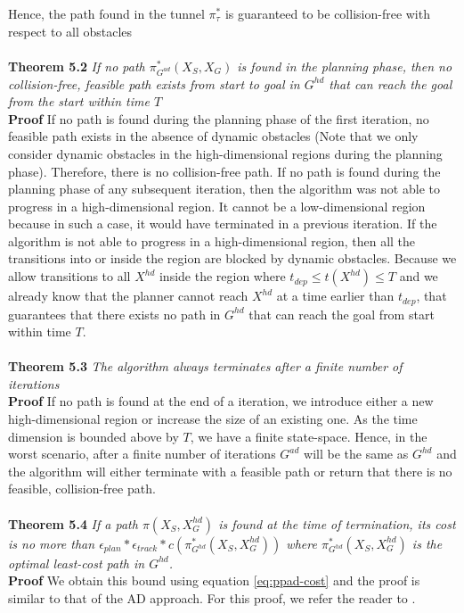 Hence, the path found in the tunnel $\pi_\tau^*$ is guaranteed to be collision-free with respect to all obstacles \QEDB \\ \\
\textbf{Theorem 5.2} \textit{If no path $\pi_{G^{ad}}^*(X_S,X_G)$ is found in the planning phase, then no collision-free, feasible path exists from start to goal in $G^{hd}$ that can reach the goal from the start within time $T$} \\
\textbf{Proof} If no path is found during the planning phase of the first iteration, no feasible path exists in the absence of dynamic obstacles (Note that we only consider dynamic obstacles in the high-dimensional regions during the planning phase). Therefore, there is no collision-free path. If no path is found during the planning phase of any subsequent iteration, then the algorithm was not able to progress in a high-dimensional region. It cannot be a low-dimensional region because in such a case, it would have terminated in a previous iteration. If the algorithm is not able to progress in a high-dimensional region, then all the transitions into or inside the region are blocked by dynamic obstacles. Because we allow transitions to all $X^{hd}$ inside the region where $t_{dep} \leq t(X^{hd}) \leq T$ and we already know that the planner cannot reach $X^{hd}$ at a time earlier than $t_{dep}$, that guarantees that there exists no path in $G^{hd}$ that can reach the goal from start within time $T$.\QEDB\\ \\
\textbf{Theorem 5.3} \textit{The algorithm always terminates after a finite number of iterations} \\
\textbf{Proof} If no path is found at the end of a iteration, we introduce either a new high-dimensional region or increase the size of an existing one. As the time dimension is bounded above by $T$, we have a finite state-space. Hence, in the worst scenario, after a finite number of iterations $G^{ad}$ will be the same as $G^{hd}$ and the algorithm will either terminate with a feasible path or return that there is no feasible, collision-free path. \QEDB \\\\
\iftrue
\textbf{Theorem 5.4} \textit{If a path $\pi(X_S, X_G^{hd})$ is found at the time of termination, its cost is no more than $\epsilon_{plan}*\epsilon_{track}*c(\pi_{G^{hd}}^*(X_S,X_G^{hd}))$ where $\pi_{G^{hd}}^*(X_S,X_G^{hd})$ is the optimal least-cost path in $G^{hd}$.} \\
\textbf{Proof} We obtain this bound using equation \ref{eq:ppad-cost} and the proof is similar to that of the AD approach. For this proof, we refer the reader to \cite{gochev2011path}. \QEDB 
